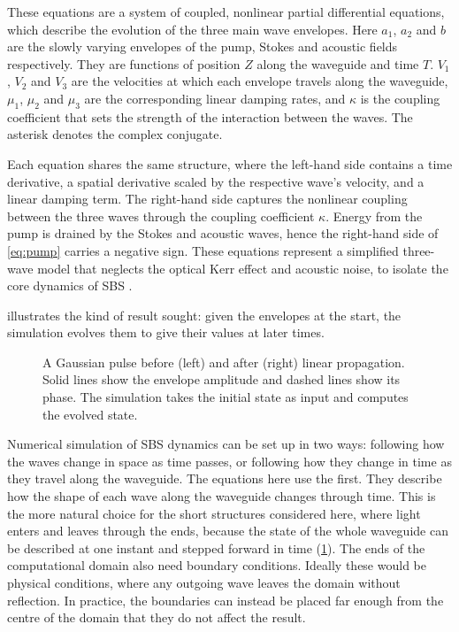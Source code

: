 These equations are a system of coupled, nonlinear partial differential equations, which describe the evolution of the three main 
wave envelopes. 
Here $a_1$, $a_2$ and $b$ are the slowly varying envelopes of the pump, Stokes and acoustic fields respectively. 
They are functions of position $Z$ along the waveguide and time $T$. $V_1$, $V_2$ and $V_3$ are the velocities at which each envelope 
travels along the waveguide, $\mu_1$, $\mu_2$ and $\mu_3$ are the corresponding linear damping rates, and $\kappa$ is the 
coupling coefficient that sets the strength of the interaction between the waves. The asterisk denotes the complex conjugate. 

Each equation shares the same structure, where the left-hand side contains a time derivative, a spatial derivative scaled by the 
respective wave's velocity, and a linear damping term. The right-hand side captures the nonlinear coupling between the three waves through the coupling coefficient $\kappa$. Energy from the pump is drained by the Stokes 
and acoustic waves, hence the right-hand side of \cref{eq:pump} carries a negative sign. These equations represent a simplified three-wave 
model that neglects the optical Kerr effect and acoustic noise, to isolate the core dynamics of SBS 
\parencite{montesThreewaveDissipativeBrillouin2008}.

 illustrates the kind of result sought: given the envelopes at the start, the simulation evolves them 
to give their values at later times.

\begin{figure}
  \centering
  \caption{A Gaussian pulse before (left) and after (right) linear propagation. Solid lines show the envelope amplitude 
and dashed lines show its phase. The simulation takes the initial state as input and computes the evolved state.}
  \label{fig:PulseSimulated}
\end{figure}

Numerical simulation of SBS dynamics can be set up in two ways: following how the waves change in space as time passes, or following 
how they change in time as they travel along the waveguide. The equations here use the first. They describe how the shape of each wave 
along the waveguide changes through time. This is the more natural choice for the short structures considered here, where light 
enters and leaves through the ends, because the state of the whole waveguide can be described at one instant and stepped forward in 
time (\cref{fig:PulseSimulated}).
The ends of the computational domain also need boundary conditions. Ideally these would be physical conditions, where any
outgoing wave leaves the domain without reflection. In practice, the boundaries can instead be placed far enough from the centre
of the domain that they do not affect the result.

